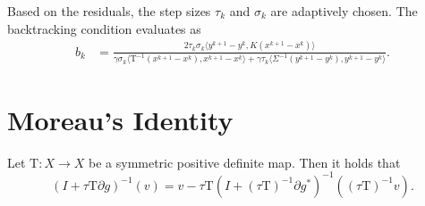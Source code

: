 \documentclass[A4,12pt]{article}
\newcommand{\rslv}[1]{(I + #1)^{-1}}
\providecommand{\iprod}[2]{\langle#1,#2\rangle}
\newcommand{\Tau}{\mathrm{T}}
\begin{document}
Based on the residuals, the step sizes $\tau_k$ and $\sigma_k$ are adaptively chosen. The backtracking condition evaluates as
\begin{equation}
  \begin{aligned}
    b_k &= \frac{2 \tau_k \sigma_k \iprod{y^{k+1} - y^k}{K (x^{k+1} - x^k)}}{\gamma \sigma_k \iprod{\Tau^{-1}(x^{k+1} - x^k)}{x^{k+1} - x^k} + \gamma \tau_k \iprod{\Sigma^{-1}(y^{k+1} - y^k)}{y^{k+1} - y^k}}.
\end{aligned}
\end{equation}

\section{Moreau's Identity}
Let $\Tau : X \rightarrow X$ be a symmetric positive definite
map. Then it holds that
\begin{equation}
  \rslv{\tau \Tau \partial g}(v) = v - \tau \Tau \rslv{(\tau
    \Tau)^{-1} \partial g^*}((\tau \Tau)^{-1}v).
\end{equation}
\end{document}
